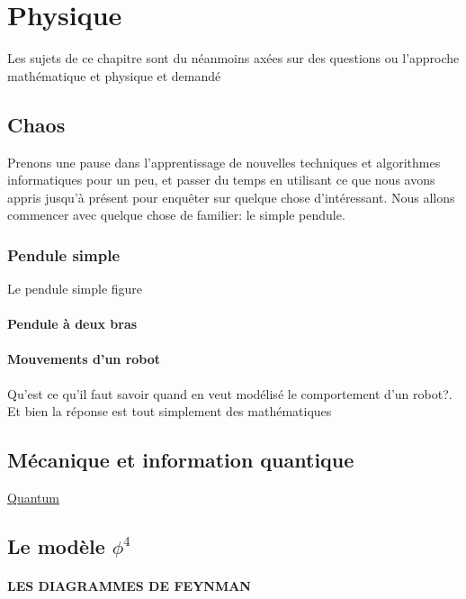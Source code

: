 \part{Physique}

Les sujets de ce chapitre sont du néanmoins axées sur des questions ou l'approche mathématique et 
physique et demandé 

\chapter{Chaos}
Prenons une pause dans l'apprentissage de nouvelles techniques et algorithmes informatiques
pour un peu, et passer du temps en utilisant ce que nous avons appris jusqu'à présent pour enquêter sur quelque chose d'intéressant. Nous allons commencer avec quelque chose de familier: le simple pendule.
\section{Pendule simple}
Le pendule simple figure
\subsection{Pendule à deux bras}
\subsection{Mouvements d’un robot}
Qu'est ce qu'il faut savoir quand en veut modélisé le comportement d'un robot?. Et bien la réponse est tout simplement des mathématiques

\chapter{M\'ecanique et information quantique}
\href{https://arxiv.org/pdf/1812.09167.pdf}{Quantum}
\chapter{Le modèle $\phi^{4}$}
 \subsection{LES DIAGRAMMES DE FEYNMAN}
 
